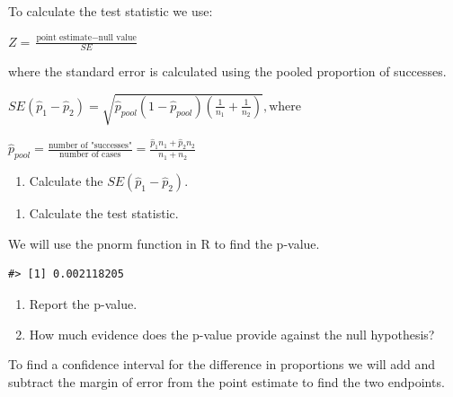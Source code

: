 \documentclass[
]{report}
\providecommand{\tightlist}{%
  \setlength{\itemsep}{0pt}\setlength{\parskip}{0pt}}
\begin{document}
To calculate the test statistic we use:

\begin{center}
    $Z = \frac{\text{point estimate} - \text{null value}}{SE}$

where the standard error is calculated using the pooled proportion of successes.

   $SE(\hat{p}_1-\hat{p}_2)=\sqrt{\hat{p}_{pool}(1-\hat{p}_{pool})(\frac{1}{n_1}+\frac{1}{n_2})}, \text{where}$ 
    
   $\hat{p}_{pool} = \frac{\text{number of "successes"}}{\text{number of cases}} = \frac{\hat{p}_1 n_1+\hat{p}_2 n_2}{n_1+n_2}$
    
\end{center}

\vspace{.25in}

\begin{enumerate}
\def\labelenumi{\arabic{enumi}.}
\setcounter{enumi}{17}
\tightlist
\item
  Calculate the \(SE(\hat{p}_1-\hat{p}_2)\).
\end{enumerate}

\vspace{1in}

\begin{enumerate}
\def\labelenumi{\arabic{enumi}.}
\setcounter{enumi}{18}
\tightlist
\item
  Calculate the test statistic.
\end{enumerate}

\vspace{1in}

We will use the pnorm function in R to find the p-value.

\begin{verbatim}
#> [1] 0.002118205
\end{verbatim}

\begin{enumerate}
\def\labelenumi{\arabic{enumi}.}
\setcounter{enumi}{19}
\item
  Report the p-value.
  \vspace{0.5in}
\item
  How much evidence does the p-value provide against the null hypothesis?
\end{enumerate}

\vspace{0.5in}

To find a confidence interval for the difference in proportions we will add and subtract the margin of error from the point estimate to find the two endpoints.
\end{document}
